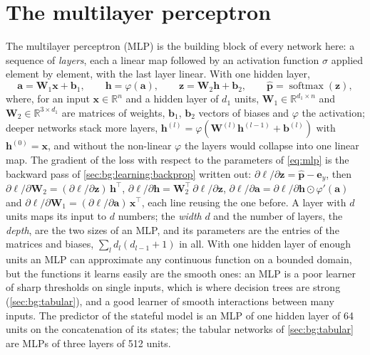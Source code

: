 \section{The multilayer perceptron}
\label{sec:bg:mlp}

The multilayer perceptron (MLP) is the building block of every network here: a sequence
of \emph{layers}, each a linear map followed by an activation function $\sigma$ applied
element by element, with the last layer linear.  With one hidden layer,
\begin{equation}
  \mathbf{a} = \mathbf{W}_1 \mathbf{x} + \mathbf{b}_1, \qquad
  \mathbf{h} = \varphi(\mathbf{a}), \qquad
  \mathbf{z} = \mathbf{W}_2 \mathbf{h} + \mathbf{b}_2, \qquad
  \hat{\mathbf{p}} = \operatorname{softmax}(\mathbf{z}),
  \label{eq:mlp}
\end{equation}
where, for an input $\mathbf{x} \in \mathbb{R}^{n}$ and a hidden layer of $d_1$ units,
$\mathbf{W}_1 \in \mathbb{R}^{d_1 \times n}$ and $\mathbf{W}_2 \in \mathbb{R}^{3
\times d_1}$ are matrices of weights, $\mathbf{b}_1$, $\mathbf{b}_2$ vectors of biases and
$\varphi$ the activation; deeper networks stack more layers, $\mathbf{h}^{(l)} =
\varphi(\mathbf{W}^{(l)} \mathbf{h}^{(l-1)} + \mathbf{b}^{(l)})$ with $\mathbf{h}^{(0)} =
\mathbf{x}$, and without the non-linear $\varphi$ the layers would collapse into one
linear map.  The
gradient of the loss with respect to the parameters of \cref{eq:mlp} is the backward pass
of \cref{sec:bg:learning:backprop} written out: $\partial \ell / \partial \mathbf{z} =
\hat{\mathbf{p}} - \mathbf{e}_y$, then $\partial \ell / \partial \mathbf{W}_2 =
(\partial \ell / \partial \mathbf{z})\, \mathbf{h}^{\top}$, $\partial \ell / \partial
\mathbf{h} = \mathbf{W}_2^{\top}\, \partial \ell / \partial \mathbf{z}$, $\partial \ell /
\partial \mathbf{a} = \partial \ell / \partial \mathbf{h} \odot \varphi'(\mathbf{a})$ and
$\partial \ell / \partial \mathbf{W}_1 = (\partial \ell / \partial \mathbf{a})\,
\mathbf{x}^{\top}$, each line reusing the one before.  A layer
with $d$ units maps its input to $d$ numbers; the \emph{width} $d$ and the number of
layers, the \emph{depth}, are the two sizes of an MLP, and its parameters are the entries
of the matrices and biases, $\sum_l d_l (d_{l-1} + 1)$ in all.  With one hidden layer of
enough units an MLP can approximate any continuous function on a bounded domain, but the
functions it learns easily are the smooth ones: an MLP is a poor learner of sharp
thresholds on single inputs, which is where decision trees are strong
(\cref{sec:bg:tabular}), and a good learner of smooth interactions between many inputs.
The predictor of the stateful model is an MLP of one hidden layer of 64 units on the
concatenation of its states; the tabular networks of \cref{sec:bg:tabular} are MLPs of
three layers of 512 units.

